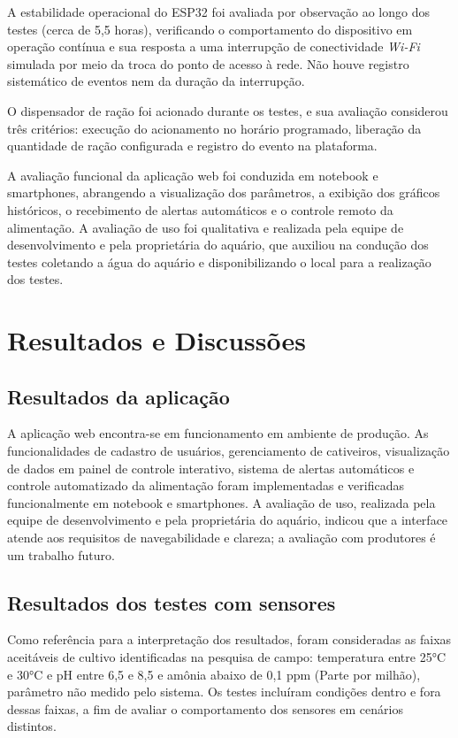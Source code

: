 \documentclass[11pt,a4paper]{article}
\begin{document}
A estabilidade operacional do ESP32 foi avaliada por observação ao longo dos testes (cerca de 5,5 horas), verificando o comportamento do dispositivo em operação contínua e sua resposta a uma interrupção de conectividade \textit{Wi-Fi} simulada por meio da troca do ponto de acesso à rede. Não houve registro sistemático de eventos nem da duração da interrupção.
 
O dispensador de ração foi acionado durante os testes, e sua avaliação considerou três critérios: execução do acionamento no horário programado, liberação da quantidade de ração configurada e registro do evento na plataforma.
 
A avaliação funcional da aplicação web foi conduzida em notebook e smartphones, abrangendo a visualização dos parâmetros, a exibição dos gráficos históricos, o recebimento de alertas automáticos e o controle remoto da alimentação. A avaliação de uso foi qualitativa e realizada pela equipe de desenvolvimento e pela proprietária do aquário, que auxiliou na condução dos testes coletando a água do aquário e disponibilizando o local para a realização dos testes.

\section{Resultados e Discussões}

\subsection{Resultados da aplicação}

A aplicação web encontra-se em funcionamento em ambiente de produção. As funcionalidades de cadastro de usuários, gerenciamento de cativeiros, visualização de dados em painel de controle interativo, sistema de alertas automáticos e controle automatizado da alimentação foram implementadas e verificadas funcionalmente em notebook e smartphones. A avaliação de uso, realizada pela equipe de desenvolvimento e pela proprietária do aquário, indicou que a interface atende aos requisitos de navegabilidade e clareza; a avaliação com produtores é um trabalho futuro.

\subsection{Resultados dos testes com sensores}

Como referência para a interpretação dos resultados, foram consideradas as faixas aceitáveis de cultivo identificadas na pesquisa de campo: temperatura entre 25°C e 30°C e pH entre 6,5 e 8,5 e amônia abaixo de 0,1 ppm (Parte por milhão), parâmetro não medido pelo sistema. Os testes incluíram condições dentro e fora dessas faixas, a fim de avaliar o comportamento dos sensores em cenários distintos.
\end{document}
